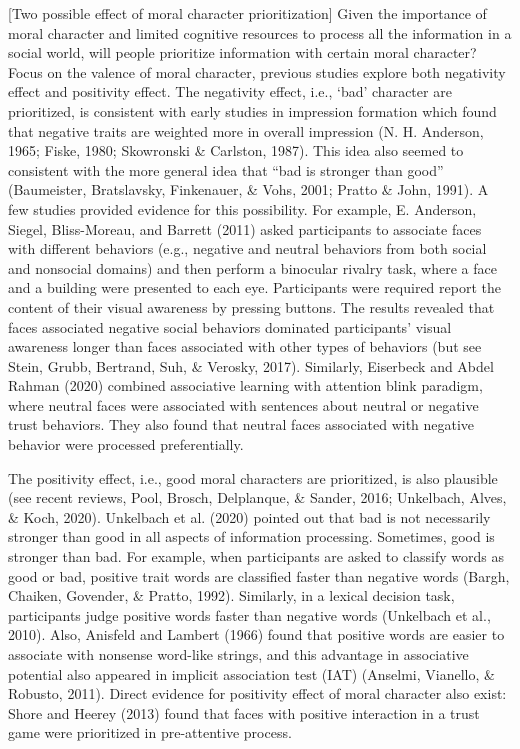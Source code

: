 \documentclass[
  man]{apa6}
\begin{document}
{[}Two possible effect of moral character prioritization{]}
Given the importance of moral character and limited cognitive resources to process all the information in a social world, will people prioritize information with certain moral character? Focus on the valence of moral character, previous studies explore both negativity effect and positivity effect. The negativity effect, i.e., `bad' character are prioritized, is consistent with early studies in impression formation which found that negative traits are weighted more in overall impression (N. H. Anderson, 1965; Fiske, 1980; Skowronski \& Carlston, 1987). This idea also seemed to consistent with the more general idea that ``bad is stronger than good'' (Baumeister, Bratslavsky, Finkenauer, \& Vohs, 2001; Pratto \& John, 1991). A few studies provided evidence for this possibility. For example, E. Anderson, Siegel, Bliss-Moreau, and Barrett (2011) asked participants to associate faces with different behaviors (e.g., negative and neutral behaviors from both social and nonsocial domains) and then perform a binocular rivalry task, where a face and a building were presented to each eye. Participants were required report the content of their visual awareness by pressing buttons. The results revealed that faces associated negative social behaviors dominated participants' visual awareness longer than faces associated with other types of behaviors (but see Stein, Grubb, Bertrand, Suh, \& Verosky, 2017). Similarly, Eiserbeck and Abdel Rahman (2020) combined associative learning with attention blink paradigm, where neutral faces were associated with sentences about neutral or negative trust behaviors. They also found that neutral faces associated with negative behavior were processed preferentially.

The positivity effect, i.e., good moral characters are prioritized, is also plausible (see recent reviews, Pool, Brosch, Delplanque, \& Sander, 2016; Unkelbach, Alves, \& Koch, 2020). Unkelbach et al. (2020) pointed out that bad is not necessarily stronger than good in all aspects of information processing. Sometimes, good is stronger than bad. For example, when participants are asked to classify words as good or bad, positive trait words are classified faster than negative words (Bargh, Chaiken, Govender, \& Pratto, 1992). Similarly, in a lexical decision task, participants judge positive words faster than negative words (Unkelbach et al., 2010). Also, Anisfeld and Lambert (1966) found that positive words are easier to associate with nonsense word-like strings, and this advantage in associative potential also appeared in implicit association test (IAT) (Anselmi, Vianello, \& Robusto, 2011). Direct evidence for positivity effect of moral character also exist: Shore and Heerey (2013) found that faces with positive interaction in a trust game were prioritized in pre-attentive process.
\end{document}
